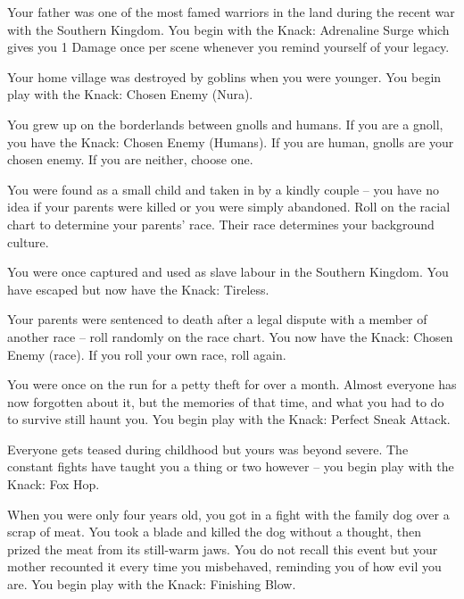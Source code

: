 \begin{list}{\addtocounter{list}{1}\textbf{:}}{\raggedleft}
\item{Your father was one of the most famed warriors in the land during the recent war with the Southern Kingdom.  You begin with the Knack: Adrenaline Surge which gives you 1 Damage once per scene whenever you remind yourself of your legacy.}

\item{Your home village was destroyed by goblins when you were younger.  You begin play with the Knack: Chosen Enemy (Nura).}

\item{You grew up on the borderlands between gnolls and humans.  If you are a gnoll, you have the Knack: Chosen Enemy (Humans).  If you are human, gnolls are your chosen enemy.  If you are neither, choose one.}

\item{You were found as a small child and taken in by a kindly couple -- you have no idea if your parents were killed or you were simply abandoned. Roll on the racial chart to determine your parents' race.  Their race determines your background culture.}

\item{You were once captured and used as slave labour in the Southern Kingdom.  You have escaped but now have the Knack: Tireless.}

\item{Your parents were sentenced to death after a legal dispute with a member of another race -- roll randomly on the race chart.  You now have the Knack: Chosen Enemy (race).  If you roll your own race, roll again.}

\item{You were once on the run for a petty theft for over a month.  Almost everyone has now forgotten about it, but the memories of that time, and what you had to do to survive still haunt you.  You begin play with the Knack: Perfect Sneak Attack.}

\item{Everyone gets teased during childhood but yours was beyond severe.  The constant fights have taught you a thing or two however -- you begin play with the Knack: Fox Hop.}

\item{When you were only four years old, you got in a fight with the family dog over a scrap of meat.  You took a blade and killed the dog without a thought, then prized the meat from its still-warm jaws.  You do not recall this event but your mother recounted it every time you misbehaved, reminding you of how evil you are.  You begin play with the Knack: Finishing Blow.}


\end{list}
